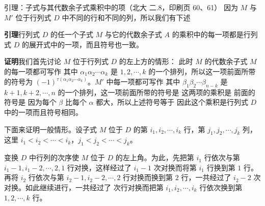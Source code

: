\begin{fdeep}{引理：子式与其代数余子式乘积中的项（北大 二.8，印刷页 60、61）}
因为 $M$ 与 $M'$ 位于行列式 $D$ 中不同的行和不同的列，所以我们有下述

\textbf{引理}\quad 行列式 $D$ 的任一个子式 $M$ 与它的代数余子式 $A$ 的乘积中的每一项都是行列式 $D$ 的展开式中的一项，而且符号也一致。

\textbf{证明}\quad 我们首先讨论 $M$ 位于行列式 $D$ 的左上方的情形：
此时 $M$ 的代数余子式
$M$ 的每一项都可写作
其中 $\alpha_1\alpha_2\cdots\alpha_k$ 是 $1,2,\cdots,k$ 的一个排列，所以这一项前面所带的符号为 $(-1)^{\tau(\alpha_1\alpha_2\cdots\alpha_k)}$。$M'$ 中每一项都可写作
其中 $\beta_1\beta_2\cdots\beta_{n-k}$ 是 $k+1,k+2,\cdots,n$ 的一个排列，这一项前面所带的符号是
这两项的乘积是
前面的符号是
因为每个 $\beta$ 比每个 $\alpha$ 都大，所以上述符号等于
因此这个乘积是行列式 $D$ 中的一项而且符号相同。

下面来证明一般情形。设子式 $M$ 位于 $D$ 的第 $i_1,i_2,\cdots,i_k$ 行，第 $j_1,j_2,\cdots,j_k$ 列，这里 $i_1<i_2<\cdots<i_k$，$j_1<j_2<\cdots<j_k$。

变换 $D$ 中行列的次序使 $M$ 位于 $D$ 的左上角。为此，先把第 $i_1$ 行依次与第 $i_1-1,i_1-2,\cdots,2,1$ 行对换，这样经过了 $i_1-1$ 次对换而将第 $i_1$ 行换到第 $1$ 行。再将 $i_2$ 行依次与第 $i_2-1,i_2-2,\cdots,2$ 行对换而换到第 $2$ 行，一共经过了 $i_2-2$ 次对换。如此继续进行，一共经过了
次行对换而把第 $i_1,i_2,\cdots,i_k$ 行依次换到第 $1,2,\cdots,k$ 行。


\end{fdeep}
